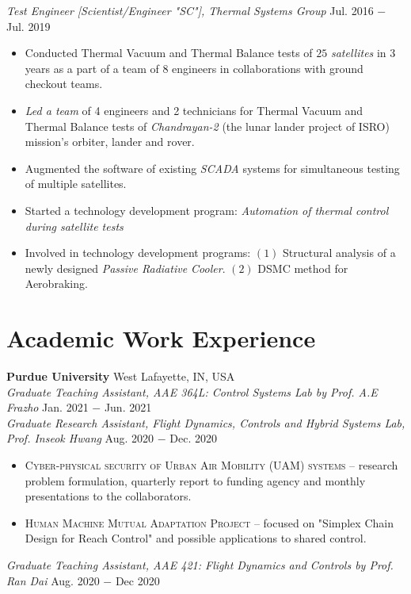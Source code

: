 \documentclass[letterpaper,10pt]{article}
\begin{document}
\vspace{3pt}
\textit{Test Engineer [Scientist/Engineer "SC"], Thermal Systems Group} \hfill Jul. 2016 $-$ Jul. 2019
\begin{itemize}[noitemsep,nolistsep,leftmargin=0.25in,label={--}]
    \item Conducted Thermal Vacuum and Thermal Balance tests of $25$ \textit{satellites} in 3 years as a part of a team of 8 engineers in collaborations with ground checkout teams.
	\item \textit{Led a team} of 4 engineers and 2 technicians for Thermal Vacuum and Thermal Balance tests of \textit{Chandrayan-2} (the lunar lander project of ISRO) mission's orbiter, lander and rover.
    \item Augmented the software of existing \textit{SCADA} systems for simultaneous testing of multiple satellites.
	\item Started a technology development program: \textit{Automation of thermal control during satellite tests}
	\item Involved in technology development programs: $(1)$ Structural analysis of a newly designed \textit{Passive Radiative Cooler}. $(2)$ DSMC method for Aerobraking.
\end{itemize}

\section{Academic Work Experience}
\noindent \textbf{Purdue University} \hfill West Lafayette, IN, USA \\
\noindent \textit{Graduate Teaching Assistant, AAE 364L: Control Systems Lab by Prof. A.E Frazho} \hfill Jan. 2021 $-$ Jun. 2021\\
\vspace{3pt}
\noindent \textit{Graduate Research Assistant, Flight Dynamics, Controls and Hybrid Systems Lab, Prof. Inseok Hwang} \hfill Aug. 2020 $-$ Dec. 2020
\begin{itemize}[noitemsep,nolistsep,leftmargin=0.25in,label={--}]
    \item \textsc{Cyber-physical security of Urban Air Mobility (UAM) systems} -- research problem formulation, quarterly report to funding agency and monthly presentations to the collaborators.
	\item \textsc{Human Machine Mutual Adaptation Project} -- focused on "Simplex Chain Design for Reach Control" and possible applications to shared control.
\end{itemize}
\vspace{3pt}
\noindent \textit{Graduate Teaching Assistant, AAE 421: Flight Dynamics and Controls by Prof. Ran Dai} \hfill Aug. 2020 $-$ Dec 2020
\end{document}
